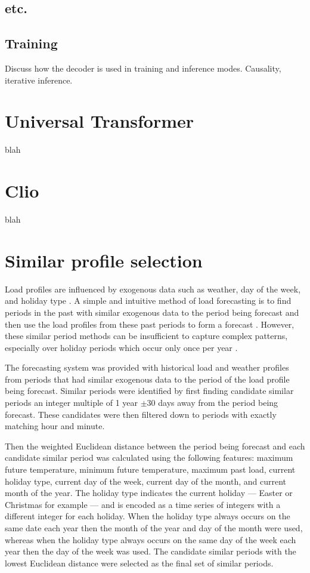 \subsection{etc.}

\subsection{Training}
Discuss how the decoder is used in training and inference modes.
Causality, iterative inference.

\section{Universal Transformer}
blah

\section{Clio}
blah

\section{Similar profile selection}
Load profiles are influenced by exogenous data such as weather, day of the week, and holiday type \cite{Weron2006}.
A simple and intuitive method of load forecasting is to find periods in the past with similar exogenous data to the period being forecast and then use the load profiles from these past periods to form a forecast \cite{Senjyu1998}.
However, these similar period methods can be insufficient to capture complex patterns, especially over holiday periods which occur only once per year \cite{Chen2010}.


The forecasting system was provided with historical load and weather profiles from periods that had similar exogenous data to the period of the load profile being forecast.
Similar periods were identified by first finding candidate similar periods an integer multiple of 1 year $\pm$30 days away from the period being forecast.
These candidates were then filtered down to periods with exactly matching hour and minute.

Then the weighted Euclidean distance between the period being forecast and each candidate similar period was calculated using the following features: 
maximum future temperature, 
minimum future temperature,
maximum past load,
current holiday type, 
current day of the week,
current day of the month, and
current month of the year.
The holiday type indicates the current holiday --- Easter or Christmas for example --- and is encoded as a time series of integers with a different integer for each holiday.
When the holiday type always occurs on the same date each year then the month of the year and day of the month were used, whereas when the holiday type always occurs on the same day of the week each year then the day of the week was used.
The candidate similar periods with the lowest Euclidean distance were selected as the final set of similar periods.

